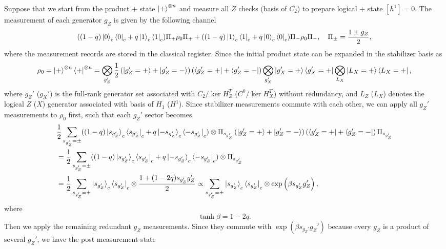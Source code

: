 \documentclass[twoside,english,aps,showpacs,pra,superscriptaddress]{revtex4-2}
\begin{document}
Suppose that we start from the product $+$ state $\ket{+}^{\otimes n}$ and measure all $Z$ checks (basis of $C_2$) to prepare logical $+$ state $[h^1] = 0$. The measurement of each generator $g_Z$ is given by the following channel
\begin{equation}
    ((1-q) \ket{0}_c\bra{0}_c + q\ket{1}_c \bra{1}_c)\Pi_+ \rho_0 \Pi_+ + ((1-q) \ket{1}_c\bra{1}_c + q\ket{0}_c \bra{0}_c)\Pi_- \rho_0 \Pi_-, \quad \Pi_{\pm} = \frac{1\pm g_Z}{2},
\end{equation}
where the measurement records are stored in the classical register.
Since the initial product state can be expanded in the stabilizer basis as 
\begin{equation}
    \rho_0 = \ket{+}^{\otimes n} \bra{+}^{\otimes n} = \bigotimes_{g_Z'} \frac{1}{2}\left(\ket{g_Z'=+}  + \ket{g_Z'=-}\right)\left(\bra{g_Z'=+}  + \bra{g_Z'=-}\right) \bigotimes_{g_X'} \ket{g_X'=+} \bra{g_X'=+} \bigotimes_{L_X} \ket{L_X=+}\bra{L_X=+},
\end{equation}
where ${g_{Z}'}$ (${g_{X}'}$) is the full-rank generator set associated with $C_2/\ker H_Z^T$ ($C^0/\ker H_X^T$) without redundancy, and $L_Z$ ($L_X$) denotes the logical $Z$ ($X$) generator associated with basis of $H_1$ ($H^1$). Since stabilizer measurements commute with each other, we can apply all $g_Z'$ measurements to $\rho_0$ first, such that each $g_Z'$ sector becomes
\begin{equation}
    \begin{aligned}
        &  \frac{1}{2}\sum_{s_{g_Z'} = \pm }((1-q) \ket{s_{g_Z'}}_c\bra{s_{g_Z'}}_c + q\ket{-s_{g_Z'}}_c \bra{-s_{g_Z'}}_c) \otimes \Pi_{s_{g_Z'}} \left(\ket{g_Z'=+}  + \ket{g_Z'=-}\right)\left(\bra{g_Z'=+}  + \bra{g_Z'=-}\right)\Pi_{s_{g_Z'}}\\
        & =  \frac{1}{2}\sum_{s_{g_Z'} = \pm }((1-q) \ket{s_{g_Z'}}_c\bra{s_{g_Z'}}_c + q\ket{-s_{g_Z'}}_c \bra{-s_{g_Z'}}_c)\otimes\Pi_{s_{g_Z'}} \\
        & =  \frac{1}{2}\sum_{s_{g_Z'} = \pm } \ket{s_{g_Z'}}_c\bra{s_{g_Z'}}_c \otimes \frac{1+(1-2q) s_{g_Z'} g_Z'}{2} \propto \sum_{s_{g_Z'} = \pm } \ket{s_{g_Z'}}_c\bra{s_{g_Z'}}_c \otimes \exp\left(\beta s_{g_Z'} g_Z'\right),
    \end{aligned}
\end{equation}
where 
\begin{equation}
    \tanh \beta = 1-2q.
\end{equation}
Then we apply the remaining redundant $g_Z$ measurements. Since they commute with $ \exp\left(\beta s_{g_Z'} g_Z'\right)$ because every $g_Z$ is a product of several $g_Z'$, we have the post measurement state
\end{document}
